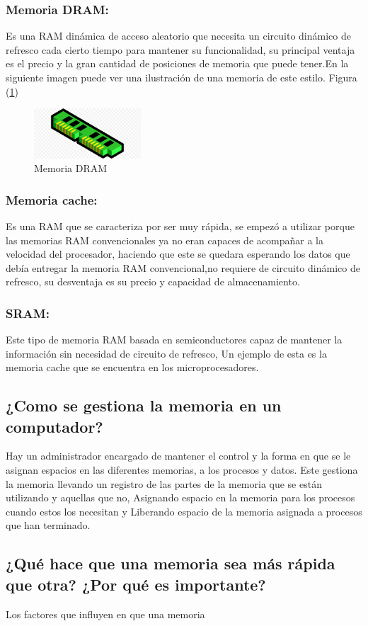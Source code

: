 \documentclass{article}
\begin{document}
\subsubsection{Memoria DRAM:}
Es una RAM dinámica de acceso aleatorio que necesita un circuito dinámico de refresco cada cierto tiempo para mantener su funcionalidad, su principal ventaja es el precio y la gran cantidad de posiciones de memoria que puede tener.En la siguiente imagen puede ver una ilustración de una memoria de este estilo. Figura
(\ref{fig:RAMM})
\begin{figure}[h]
\includegraphics[width=4cm]{RAMM.png}
\centering
\caption{Memoria DRAM}
\label{fig:RAMM}
\end{figure}

\subsubsection{Memoria cache:}
Es una RAM que se caracteriza por ser muy rápida, se empezó a utilizar porque las memorias RAM convencionales ya no eran capaces de acompañar a la velocidad del procesador, haciendo que este se quedara esperando los datos que debía entregar la memoria RAM convencional,no requiere de circuito dinámico de refresco, su desventaja es su precio y capacidad de almacenamiento.
\subsubsection{SRAM:}
Este tipo de memoria RAM basada en semiconductores capaz de mantener la información sin necesidad de circuito de refresco, Un ejemplo de esta es la memoria cache que se encuentra en los microprocesadores.
\subsection{¿Como se gestiona la memoria en un computador?}
Hay un administrador encargado de mantener el control y la forma en que se le asignan espacios en las diferentes memorias, a los procesos y datos. Este gestiona la memoria llevando un registro de las partes de la memoria que se están utilizando y aquellas que no, Asignando espacio en la memoria para los procesos cuando estos los necesitan y Liberando espacio de la memoria asignada a procesos que han terminado. 
\subsection{¿Qué hace que una memoria sea más rápida que otra? ¿Por qué es importante?}
Los factores que influyen en que una memoria
\end{document}
